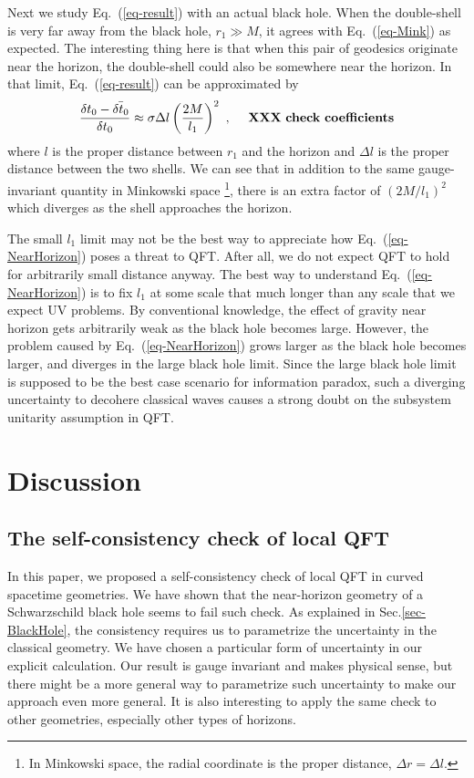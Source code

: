 \documentclass[aps,showpacs,twocolumn,floats,prd,superscriptaddress,nofootinbib]{revtex4-1}
\begin{document}
Next we study Eq.~(\ref{eq-result}) with an actual black hole. 
When the double-shell is very far away from the black hole, $r_1\gg M$, it agrees with Eq.~(\ref{eq-Mink}) as expected. 
The interesting thing here is that when this pair of geodesics originate near the horizon, the double-shell could also be somewhere near the horizon. 
In that limit, Eq.~(\ref{eq-result}) can be approximated by
\begin{equation}
\frac{\delta t_0 - \bar{\delta t_0}}{\delta t_0} \approx
\sigma \Delta l \left(\frac{2M}{l_1}\right)^2~, \ \ \ \ {\rm \bf XXX \ check \ coefficients}
\label{eq-NearHorizon}
\end{equation}
where $l$ is the proper distance between $r_1$ and the horizon and $\Delta l$ is the proper distance between the two shells. 
We can see that in addition to the same gauge-invariant quantity in Minkowski space
\footnote{In Minkowski space, the radial coordinate is the proper distance, $\Delta r=\Delta l$.}, 
there is an extra factor of $(2M/l_1)^2$ which diverges as the shell approaches the horizon.

The small $l_1$ limit may not be the best way to appreciate how Eq.~(\ref{eq-NearHorizon}) poses a threat to QFT. 
After all, we do not expect QFT to hold for arbitrarily small distance anyway. 
The best way to understand Eq.~(\ref{eq-NearHorizon}) is to fix $l_1$ at some scale that much longer than any scale that we expect UV problems. 
By conventional knowledge, the effect of gravity near horizon gets arbitrarily weak as the black hole becomes large. 
However, the problem caused by Eq.~(\ref{eq-NearHorizon}) grows larger as the black hole becomes larger, and diverges in the large black hole limit.
Since the large black hole limit is supposed to be the best case scenario for information paradox, such a diverging uncertainty to decohere classical waves causes a strong doubt on the subsystem unitarity assumption in QFT.


\section{Discussion}
\label{sec-dis}

\subsection{The self-consistency check of local QFT}

In this paper, we proposed a self-consistency check of local QFT in curved spacetime geometries.
We have shown that the near-horizon geometry of a Schwarzschild black hole seems to fail such check.
As explained in Sec.\ref{sec-BlackHole}, the consistency requires us to parametrize the uncertainty in the classical geometry.
We have chosen a particular form of uncertainty in our explicit calculation.
Our result is gauge invariant and makes physical sense, but there might be a more general way to parametrize such uncertainty to make our approach even more general.
It is also interesting to apply the same check to other geometries, especially other types of horizons.
\end{document}
